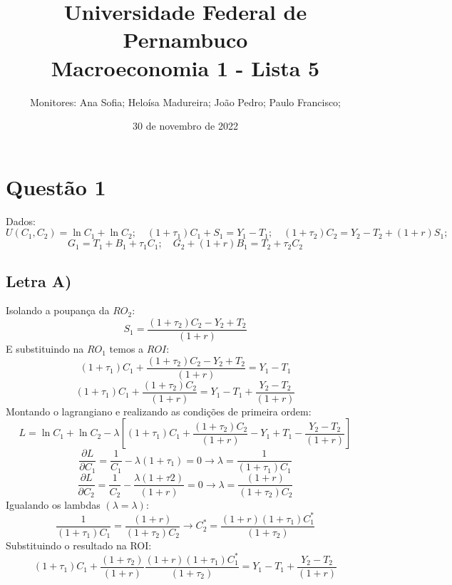 \documentclass{article}
\title{Universidade Federal de Pernambuco \\
Macroeconomia 1 - Lista 5}
\author{Monitores: Ana Sofia; Heloísa Madureira; João Pedro; Paulo Francisco;}
\date{30 de novembro de 2022}
\begin{document}
\maketitle
\section*{Questão 1}
Dados:
$$U(C_1,C_2)=\ln C_1 +\ln C_2; \quad  (1+\tau_1)C_1+S_1 = Y_1-T_1; \quad (1+\tau_2)C_2=Y_2-T_2+(1+r)S_1; $$
$$G_1 = T_1 + B_1 + \tau_1C_1; \quad G_2+(1+r)B_1=T_2+\tau_2C_2$$
\subsection*{Letra A)}
Isolando a poupança da $RO_2$:
\begin{equation}
    S_1= \frac{(1+\tau_2)C_2-Y_2+T_2}{(1+r)}
\end{equation}
E substituindo na $RO_1$ temos a $ROI$:
\begin{equation}
    (1+\tau_1)C_1+\frac{(1+\tau_2)C_2-Y_2+T_2}{(1+r)} = Y_1-T_1
\end{equation}
\begin{equation}
    (1+\tau_1)C_1+\frac{(1+\tau_2)C_2}{(1+r)} = Y_1-T_1+\frac{Y_2-T_2}{(1+r)}
\end{equation}
Montando o lagrangiano e realizando as condições de primeira ordem:
\begin{equation}
    L = \ln C_1 +\ln C_2-\lambda\left[(1+\tau_1)C_1+\frac{(1+\tau_2)C_2}{(1+r)}-Y_1+T_1 -\frac{Y_2-T_2}{(1+r)}\right]
\end{equation}
\begin{equation}
    \frac{\partial L}{\partial C_1} = \frac{1}{C_1}-\lambda(1+\tau_1)=0 \to \lambda=\frac{1}{(1+\tau_1)C_1}
\end{equation}
\begin{equation}
    \frac{\partial L}{\partial C_2} = \frac{1}{C_2}-\frac{\lambda(1+\tau2)}{(1+r)}=0 \to \lambda=\frac{(1+r)}{(1+\tau_2)C_2}
\end{equation}
Igualando os lambdas $(\lambda=\lambda)$:
\begin{equation}\label{eq:1aeqlambda}
    \frac{1}{(1+\tau_1)C_1} = \frac{(1+r)}{(1+\tau_2)C_2} \to 
    C_2^*=\frac{(1+r)(1+\tau_1)C_1^*}{(1+\tau_2)}
\end{equation}
Substituindo o resultado na ROI:
\begin{equation}
    (1+\tau_1)C_1+\frac{(1+\tau_2)}{(1+r)}\frac{(1+r)(1+\tau_1)C_1^*}{(1+\tau_2)} = Y_1-T_1+\frac{Y_2-T_2}{(1+r)}
\end{equation}
\end{document}
